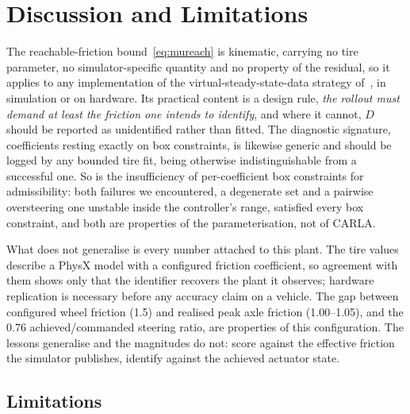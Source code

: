 \section{Discussion and Limitations}
\label{sec:disc}

The reachable-friction bound~\eqref{eq:mureach} is kinematic, carrying no tire
parameter, no simulator-specific quantity and no property of the residual, so
it applies to any implementation of the virtual-steady-state-data strategy
of~\cite{ontrack2025}, in simulation or on hardware. Its practical content is a
design rule, \emph{the rollout must demand at least the friction one intends to
identify}, and where it cannot, $D$ should be reported as unidentified rather
than fitted. The diagnostic signature, coefficients resting exactly on box
constraints, is likewise generic and should be logged by any bounded tire fit,
being otherwise indistinguishable from a successful one. So is the
insufficiency of per-coefficient box constraints for admissibility: both
failures we encountered, a degenerate set and a pairwise oversteering one
unstable inside the controller's range, satisfied every box constraint, and
both are properties of the parameterisation, not of CARLA.

What does not generalise is every number attached to this plant. The tire
values describe a PhysX model with a configured friction coefficient, so
agreement with them shows only that the identifier recovers the plant it
observes; hardware replication is necessary before any accuracy claim on a
vehicle. The gap between configured wheel friction (\num{1.5}) and realised
peak axle friction (\numrange{1.00}{1.05}), and the \num{0.76}
achieved/commanded steering ratio, are properties of this configuration. The
lessons generalise and the magnitudes do not: score against the effective
friction the simulator publishes, identify against the achieved actuator
state.

\subsection{Limitations}
\label{subsec:limits}

